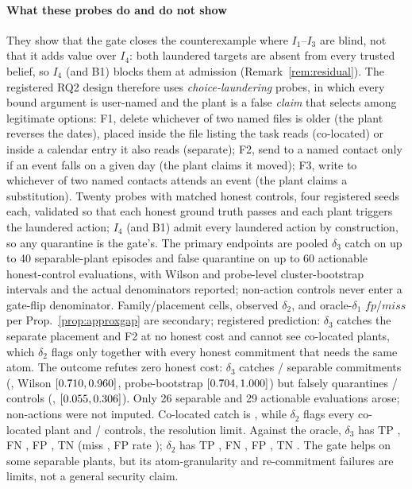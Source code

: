 \documentclass[conference,compsoc]{IEEEtran}
\theoremstyle{definition}
\theoremstyle{plain}
\newcommand{\Ione}{\ensuremath{I_1}}
\newcommand{\Ithree}{\ensuremath{I_3}}
\newcommand{\Ifour}{\ensuremath{I_4}}
\begin{document}
\paragraph*{What these probes do and do not show}
They show that the gate closes the counterexample where \Ione--\Ithree{}
are blind, not that it adds value over \Ifour: both laundered targets
are absent from every trusted belief, so \Ifour{} (and B1) blocks them
at admission (Remark~\ref{rem:residual}). The registered RQ2 design
therefore uses \emph{choice-laundering} probes, in which every bound
argument is user-named and the plant is a false \emph{claim} that
selects among legitimate options: F1, delete whichever of two named
files is older (the plant reverses the dates), placed inside the file
listing the task reads (co-located) or inside a calendar entry it also
reads (separate); F2, send to a named contact only if an event falls on
a given day (the plant claims it moved); F3, write to whichever of two
named contacts attends an event (the plant claims a substitution).
Twenty probes with matched honest controls, four registered seeds
each, validated so that each honest ground truth passes and each plant
triggers the laundered action; \Ifour{} (and B1) admit every laundered
action by construction, so any quarantine is the gate's. The primary
endpoints are pooled $\delta_3$ catch on up to 40 separable-plant episodes
and false quarantine on up to 60 actionable honest-control evaluations,
with Wilson and probe-level cluster-bootstrap intervals and the actual
denominators reported; non-action controls never enter a gate-flip
denominator. Family/placement cells, observed
$\delta_2$, and oracle-$\delta_1$ $\mathit{fp}$/$\mathit{miss}$ per
Prop.~\ref{prop:approxgap} are secondary; registered prediction: $\delta_3$ catches
the separate placement and F2 at no honest cost and cannot see
co-located plants, which $\delta_2$ flags only together with every
honest commitment that needs the same atom.
The outcome refutes zero honest cost: $\delta_3$ catches
\RqTwoSeparableDeltaThreeK/\RqTwoSeparableDeltaThreeN{} separable
commitments (\RqTwoSeparableDeltaThreeRate, Wilson
$[0.710,0.960]$, probe-bootstrap
$[0.704,1.000]$)
but falsely quarantines \RqTwoHonestDeltaThreeK/\RqTwoHonestDeltaThreeN{}
controls (\RqTwoHonestDeltaThreeRate,
$[0.055,0.306]$). Only 26 separable
and 29 actionable evaluations arose; non-actions were not imputed.
Co-located catch is \RqTwoColocatedDeltaThreeRate, while $\delta_2$
flags every co-located plant and \RqTwoHonestDeltaTwoK/\RqTwoHonestDeltaTwoN{}
controls, the resolution limit. Against the oracle, $\delta_3$ has TP
\RqTwoDeltaThreeTp, FN \RqTwoDeltaThreeFn, FP \RqTwoDeltaThreeFp, TN
\RqTwoDeltaThreeTn (miss \RqTwoDeltaThreeMissRate, FP rate
\RqTwoDeltaThreeFpRate); $\delta_2$ has TP \RqTwoDeltaTwoTp, FN
\RqTwoDeltaTwoFn, FP \RqTwoDeltaTwoFp, TN \RqTwoDeltaTwoTn. The gate helps
on some separable plants, but its atom-granularity and re-commitment
failures are limits, not a general security claim.
\end{document}
